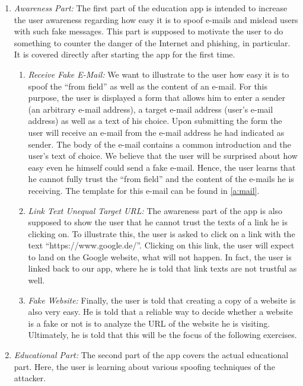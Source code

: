 \begin{enumerate}
	\item \textit{Awareness Part:} The first part of the education app is intended to increase the user awareness regarding how easy it is to spoof e-mails and mislead users with such fake messages.
 This part is supposed to motivate the user to do something to counter the danger of the Internet and phishing, in particular.
It is covered directly after starting the app for the first time.
\begin{enumerate}
		\item \textit{Receive Fake E-Mail:} We want to illustrate to the user how easy it is to spoof the ``from field'' as well as the content of an e-mail.
 For this purpose, the user is displayed a form that allows him to enter a sender (an arbitrary e-mail address), a target e-mail address (user's e-mail address) as well as a text of his choice.
 Upon submitting the form the user will receive an e-mail from the e-mail address he had indicated as sender.
The body of the e-mail contains a common introduction and the user's text of choice.
 We believe that the user will be surprised about how easy even he himself could send a fake e-mail.
Hence, the user learns that he cannot fully trust the ``from field'' and the content of the e-mails he is receiving.
The template for this e-mail can be found in \autoref{a:mail}.
		\item \textit{Link Text Unequal Target URL:} The awareness part of the app is also supposed to show the user that he cannot trust the texts of a link he is clicking on.
 To illustrate this, the user is asked to click on a link with the text ``https://www.google.de/''. Clicking on this link, the user will expect to land on the Google website, what will not happen.
 In fact, the user is linked back to our app, where he is told that link texts are not trustful as well.
 
	\item \textit{Fake Website:} Finally, the user is told that creating a copy of a website is also very easy.
 He is told that a reliable way to decide whether a website is a fake or not is to analyze the URL of the website he is visiting.
Ultimately, he is told that this will be the focus of the following exercises.

\end{enumerate}
	\item \textit{Educational Part:} The second part of the app covers the actual educational part.
 Here, the user is learning about various spoofing techniques of the attacker.


\end{enumerate}
